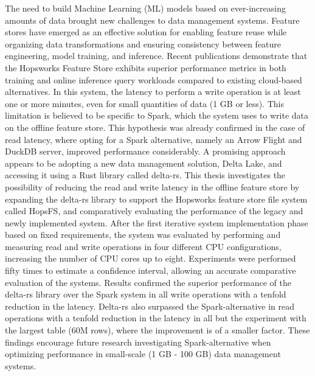 \begin{scontents}[store-env=abstracts,print-env=true]
The need to build Machine Learning (ML) models based on ever-increasing amounts of data brought new challenges to data management systems. Feature stores have emerged as an effective solution for enabling feature reuse while organizing data transformations and ensuring consistency between feature engineering, model training, and inference. Recent publications demonstrate that the Hopsworks Feature Store exhibits superior performance metrics in both training and online inference query workloads compared to existing cloud-based alternatives. In this system, the latency to perform a write operation is at least one or more minutes, even for small quantities of data (1 GB or less). This limitation is believed to be specific to Spark, which the system uses to write data on the offline feature store. This hypothesis was already confirmed in the case of read latency, where opting for a Spark alternative, namely an Arrow Flight and DuckDB server, improved performance considerably. A promising approach appears to be adopting a new data management solution, Delta Lake, and accessing it using a Rust library called delta-rs. This thesis investigates the possibility of reducing the read and write latency in the offline feature store by expanding the delta-rs library to support the Hopsworks feature store file system called HopsFS, and comparatively evaluating the performance of the legacy and newly implemented system. After the first iterative system implementation phase based on fixed requirements, the system was evaluated by performing and measuring read and write operations in four different CPU configurations, increasing the number of CPU cores up to eight. Experiments were performed fifty times to estimate a confidence interval, allowing an accurate comparative evaluation of the systems. Results confirmed the superior performance of the delta-rs library over the Spark system in all write operations with a tenfold reduction in the latency. Delta-rs also surpassed the Spark-alternative in read operations with a tenfold reduction in the latency in all but the experiment with the largest table (60M rows), where the improvement is of a smaller factor. These findings encourage future research investigating Spark-alternative when optimizing performance in small-scale (1 GB - 100 GB) data management systems.
\end{scontents}
